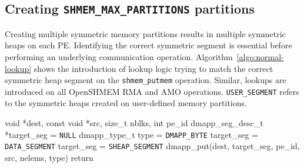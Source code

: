 \subsection{Creating \texttt{SHMEM\_MAX\_PARTITIONS} partitions}
\label{src:regression/max}
Creating multiple symmetric memory partitions results in
multiple symmetric heaps on each PE.
Identifying the correct symmetric segment is essential before
performing an
underlying communication operation. %
Algorithm~\ref{algo:normal-lookup} shows the introduction of lookup
logic trying to match the correct symmetric heap segment on the
\texttt{shmem\_putmem} operation. Similar, lookups are introduced on
all OpenSHMEM RMA and AMO operations. \texttt{USER\_SEGMENT} refers to
the symmetric heaps created on user-defined memory partitions.

\begin{algorithm}[ht!]
\begin{algorithmic}
    {void *dest, const void *src, size\_t nblks, int pe\_id}\;
        dmapp\_seg\_desc\_t *target\_seg = \texttt{NULL}\;
        dmapp\_type\_t type = \texttt{DMAPP\_BYTE}\;
         {
            target\_seg = \texttt{DATA\_SEGMENT}\;
        }  {
            target\_seg = \texttt{SHEAP\_SEGMENT}\;
        } 
        dmapp\_put(dest, target\_seg, pe\_id, src, nelems, type)\;
        return\;
    \EndProcedure
    \caption{Lookup logic with N symmetric memory partitions per PE}
    \label{algo:normal-lookup}
\end{algorithmic}
\end{algorithm}


